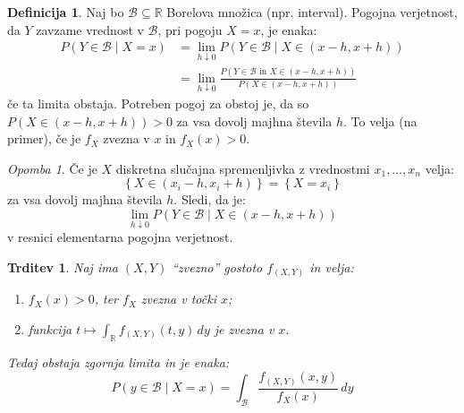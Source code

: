 \documentclass[12pt]{book}
\theoremstyle{definition}
\newtheorem{definicija}{Definicija}
\theoremstyle{plain}
\theoremstyle{plain}
\newtheorem{trditev}{Trditev}
\theoremstyle{plain}
\theoremstyle{plain}
\theoremstyle{remark}
\newtheorem*{opomba}{Opomba}
\begin{document}
\begin{definicija}
    Naj bo $\mathcal{B} \subseteq \mathbb{R}$ Borelova množica (npr. interval). Pogojna verjetnost, da $Y$ zavzame vrednost v $\mathcal{B}$, pri pogoju $X=x$, je enaka:
    $$
    \begin{aligned}
        P(Y \in \mathcal{B} \mid X=x) & =\lim _{h \downarrow 0} P(Y \in \mathcal{B} \mid X \in(x-h, x+h)) \\
        & =\lim _{h \downarrow 0} \frac{P(Y \in \mathcal{B} \text { in } X \in(x-h, x+h))}{P(X \in(x-h, x+h))}
    \end{aligned}
    $$
    če ta limita obstaja. Potreben pogoj za obstoj je, da so $P(X \in(x-h, x+h))>0$ za vsa dovolj majhna števila $h$. To velja (na primer), če je $f_X$ zvezna v $x$ in $f_X(x)>0$. 
\end{definicija}

\begin{opomba}
    Če je $X$ diskretna slučajna spremenljivka z vrednostmi $x_1, \ldots, x_n$ velja: 
    $$
    \left\{X \in\left(x_i-h, x_i+h\right)\right\}=\left\{X=x_i\right\}
    $$ 
    za vsa dovolj majhna števila $h$. Sledi, da je:
    $$
    \lim _{h \downarrow 0} P(Y \in \mathcal{B} \mid X \in(x-h, x+h))
    $$ 
    v resnici elementarna pogojna verjetnost. 
\end{opomba}

\begin{trditev}
    Naj ima $(X,Y)$ “zvezno” gostoto $f_{(X,Y)}$ in velja:
    \begin{enumerate}
        \item $f_X(x) > 0$, ter $f_X$ zvezna v točki $x$;
        \item funkcija $t \mapsto \int_{\mathbb{R}} f_{(X, Y)}(t, y) \,d y$ je zvezna v $x$. 
    \end{enumerate}
    Tedaj obstaja zgornja limita in je enaka: 
    $$
    P(y \in \mathcal{B} \mid X=x)=\int_\mathcal{B} \frac{f_{(X, Y)}(x, y)}{f_X(x)} \,d y
    $$
\end{trditev}
\end{document}
